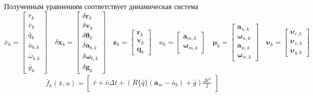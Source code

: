 \documentclass[12pt]{article}
\begin{document}
Полученным уравнениям соответствует динамическая система
{\small
\begin{equation}
    \bar{x}_{k}=\begin{bmatrix}
        \bar{r}_{k}   \\ \bar{v}_{k} \\ \bar{q}_{k} \\
        \bar{a}_{b,k} \\ \bar{\omega}_{b,k} \\ \bar{g}_{k}
    \end{bmatrix}
    \quad
    \delta \pmb{x}_{k}=\begin{bmatrix}
        \delta \pmb{r}_{k}   \\ \delta \pmb{v}_{k} \\ \delta \pmb{\theta}_{k} \\
        \delta \pmb{a}_{b,k} \\ \delta \pmb{\omega}_{b,k} \\ \delta \pmb{g}_{k}
    \end{bmatrix}
    \quad
    \pmb{z}_{k}=\begin{bmatrix}
        \pmb{r}_{k} \\ \pmb{v}_{k} \\ \pmb{q}_{k}
    \end{bmatrix}
    \quad
    u_{k}=\begin{bmatrix}
        \pmb{a}_{m,k} \\
        \pmb{\omega}_{m,k}
    \end{bmatrix}
    \quad
    \pmb{\mu}_{k}=\begin{bmatrix}
        \pmb{a}_{n,k} \\ \pmb{\omega}_{n,k} \\
        \pmb{a}_{w,k} \\ \pmb{\omega}_{w,k}
    \end{bmatrix}
    \quad
    \pmb{\nu}_{k}=\begin{bmatrix}
        \pmb{\nu}_{r,k} \\ \pmb{\nu}_{v,k} \\ \pmb{\nu}_{q,k}
    \end{bmatrix}
\end{equation}
\begin{equation}
    \begin{aligned}
        \bar{f}_k(\bar{x},u)=\begin{bmatrix}
            \bar{r} + \bar{v} \Delta t
            + (R\{\bar{q}\} (\pmb{a}_{m} - \bar{a}_{b})
            + \bar{g}) \frac{\Delta t^2}{2}                                    \\

\end{bmatrix}
\end{aligned}
\end{equation}}
\end{document}
